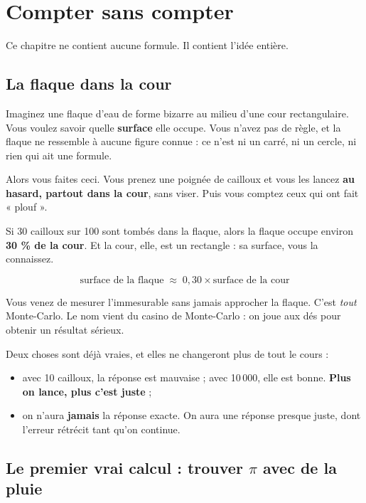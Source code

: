 \chapter{Compter sans compter}

Ce chapitre ne contient aucune formule. Il contient l'idée entière.

\section{La flaque dans la cour}

Imaginez une flaque d'eau de forme bizarre au milieu d'une cour rectangulaire.
Vous voulez savoir quelle \textbf{surface} elle occupe. Vous n'avez pas de
règle, et la flaque ne ressemble à aucune figure connue : ce n'est ni un carré,
ni un cercle, ni rien qui ait une formule.

Alors vous faites ceci. Vous prenez une poignée de cailloux et vous les lancez
\textbf{au hasard, partout dans la cour}, sans viser. Puis vous comptez ceux qui
ont fait « plouf ».

\begin{nkretenir}
Si 30 cailloux sur 100 sont tombés dans la flaque, alors la flaque occupe
environ \textbf{30 \% de la cour}. Et la cour, elle, est un rectangle : sa
surface, vous la connaissez.

\[ \text{surface de la flaque} \;\approx\; 0{,}30 \times \text{surface de la cour} \]
\end{nkretenir}

Vous venez de mesurer l'immesurable sans jamais approcher la flaque. C'est
\emph{tout} Monte-Carlo. Le nom vient du casino de Monte-Carlo : on joue aux
dés pour obtenir un résultat sérieux.

Deux choses sont déjà vraies, et elles ne changeront plus de tout le cours :

\begin{itemize}
  \item avec 10 cailloux, la réponse est mauvaise ; avec 10\,000, elle est
        bonne. \textbf{Plus on lance, plus c'est juste} ;
  \item on n'aura \textbf{jamais} la réponse exacte. On aura une réponse
        presque juste, dont l'erreur rétrécit tant qu'on continue.
\end{itemize}

\section{Le premier vrai calcul : trouver $\pi$ avec de la pluie}

